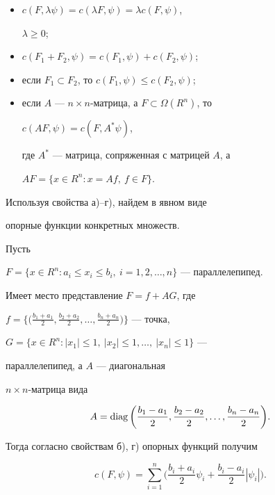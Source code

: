 \begin{itemize} 


\item[а)] $c(F,\lambda\psi)=c(\lambda F,\psi)=\lambda c(F,\psi)$, 


$\lambda\ge0$; 


\item[б)] $c(F_1+F_2,\psi)=c(F_1,\psi)+c(F_2,\psi)$; 


\item[в)] если $F_1\subset F_2$, то $c(F_1,\psi)\le c(F_2,\psi)$; 


\item[г)] если $A$ --- $n\times n$-матрица, а $F\subset \Omega(R^n)$, то 


$c(A F,\psi)=c(F,A^*\psi)$, 


где $A^*$ --- матрица, сопряженная с матрицей $A$, а 


$A F=\{x\in R^n:x=A f,\ f\in F\}$. 


\end{itemize} 


 


Используя свойства а)--г), найдем в явном виде 


опорные функции конкретных множеств. 


 


\begin{exam} 


Пусть 


$F=\{x\in R^n:a_i\le x_i\le b_i,\ i=1,2,\dotsc,n\}$ --- параллелепипед. 


Имеет место представление $F=f+A G$, где 


$f=\big\{\big(\frac{b_1+a_1}{2}, \frac{b_2+a_2}{2},\dotsc, 


\frac{b_n+a_n}{2}\big)\big\}$ --- точка, 


$G=\{x\in R^n:|x_1|\le1,\ |x_2|\le1,\dotsc,\ |x_n|\le1\}$ --- 


параллелепипед, а $A$ --- диагональная 


$n\times n$-матрица вида 


$$ 


A=\diag\bigg(\frac{b_1-a_1}{2}, \frac{b_2-a_2}{2},\dotsc, 


\frac{b_n-a_n}{2} \bigg). 


$$ 


Тогда согласно свойствам б), г) опорных функций получим 


$$ 


c(F,\psi)=\sum^n_{i=1}\bigg(\frac{b_i+a_i}{2}\psi_i 


+\frac{b_i-a_i}{2}|\psi_i| \bigg). 


$$ 


\end{exam} 


